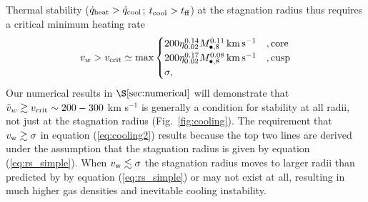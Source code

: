 \documentclass[usenatbib,fleqn]{mn2e}
\newcommand\lsim{\mathrel{\rlap{\lower4pt\hbox{\hskip1pt$\sim$}}
    \raise1pt\hbox{$<$}}}
\newcommand\gsim{\mathrel{\rlap{\lower4pt\hbox{\hskip1pt$\sim$}}
    \raise1pt\hbox{$>$}}}
\begin{document}
Thermal stability ($\dot{q}_{\rm heat} > \dot{q}_{\rm cool}$; $t_{\rm cool} > t_{\rm ff}$) at the stagnation radius thus requires a critical minimum heating rate
\begin{align}
v_{w} > v_{\rm crit} \simeq
  {\rm max}\begin{cases}
   200 \eta_{0.02}^{0.14} M_{\bullet,8}^{0.11}\,{\rm km\,s^{-1}}  &, \text{core}\\
   200 \eta_{0.02}^{0.17} M_{\bullet,8}^{0.08}\,{\rm km\,s^{-1}}   &, \text{cusp}\\
\sigma,     
  \end{cases}
  \label{eq:cooling2}
\end{align}
Our numerical results in $\S\ref{sec:numerical}$ will demonstrate that $\tilde{v}_{w} \gtrsim v_{\rm crit} \sim 200-300$ km s$^{-1}$ is generally a condition for stability at all radii, not just at the stagnation radius (Fig.~\ref{fig:cooling}).  The requirement that $v_{\rm w} \gtrsim \sigma$ in equation (\ref{eq:cooling2}) results because the top two lines are derived under the assumption that the stagnation radius is given by equation (\ref{eq:rs_simple}).  When $v_{\rm w} \lesssim \sigma$ the stagnation radius moves to larger radii than predicted by by equation (\ref{eq:rs_simple}) or may not exist at all, resulting in much higher gas densities and inevitable cooling instability.  




\end{document}
